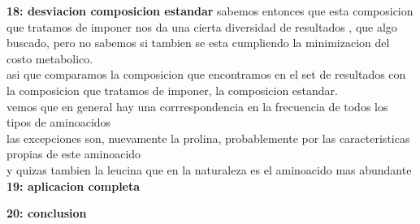 \documentclass[a4paper,10pt]{article}
\begin{document}
\textbf{18: desviacion composicion estandar}
sabemos entonces que esta composicion que tratamos de imponer nos da una cierta diversidad de resultados , que algo buscado, pero no sabemos si tambien se esta cumpliendo la minimizacion del costo metabolico.\\
asi que comparamos la composicion que encontramos en el set de resultados con la composicion que tratamos de imponer, la composicion estandar.\\
vemos que en general hay una corrrespondencia en la frecuencia de todos los tipos de aminoacidos\\
las excepciones son, nuevamente la prolina, probablemente por las caracteristicas propias de este aminoacido\\
y quizas tambien la leucina que en la naturaleza es el aminoacido mas abundante\\


\textbf{19: aplicacion completa}  %

\textbf{20: conclusion}
\end{document}
